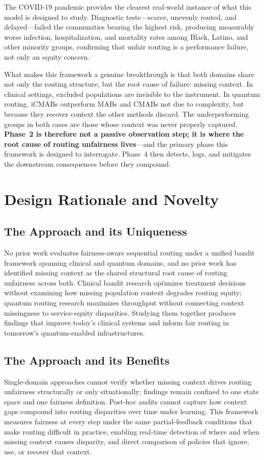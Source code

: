 \documentclass{IEEEtran}
\begin{document}
The COVID-19 pandemic provides the clearest real-world instance of what
this model is designed to study. Diagnostic tests---scarce, unevenly routed,
and delayed---failed the communities bearing the highest risk, producing
measurably worse infection, hospitalization, and mortality rates among Black,
Latino, and other minority groups, confirming that unfair routing is a
performance failure, not only an equity concern.

What makes this framework a genuine breakthrough is that both domains share
not only the routing structure, but the root cause of failure: missing
context. In clinical settings, excluded populations are invisible to the
instrument. In quantum routing, iCMABs outperform MABs and CMABs not due to
complexity, but because they recover context the other methods discard. The
underperforming groups in both cases are those whose context was never
properly captured. \textbf{Phase~2 is therefore not a passive observation
step; it is where the root cause of routing unfairness lives}---and the
primary phase this framework is designed to interrogate. Phase~4 then
detects, logs, and mitigates the downstream consequences before they compound.

\section{Design Rationale and Novelty}

\subsection{The Approach and its Uniqueness}
No prior work evaluates fairness-aware sequential routing under a unified
bandit framework spanning clinical and quantum domains, and no prior work has
identified missing context as the shared structural root cause of routing
unfairness across both. Clinical bandit research optimizes treatment decisions
without examining how missing population context degrades routing equity;
quantum routing research maximizes throughput without connecting context
missingness to service-equity disparities. Studying them together produces
findings that improve today's clinical systems and inform fair routing in
tomorrow's quantum-enabled infrastructures.

\subsection{The Approach and its Benefits}
Single-domain approaches cannot verify whether missing context drives routing
unfairness structurally or only situationally; findings remain confined to
one state space and one fairness definition. Post-hoc audits cannot capture
how context gaps compound into routing disparities over time under learning.
This framework measures fairness at every step under the same partial-feedback
conditions that make routing difficult in practice, enabling real-time
detection of where and when missing context causes disparity, and direct
comparison of policies that ignore, use, or recover that context.
\end{document}

